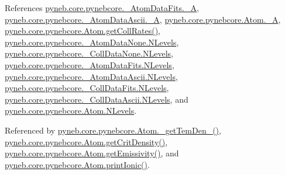 References \hyperlink{pynebcore_8py_source_l00100}{pyneb.\-core.\-pynebcore.\-\_\-\-Atom\-Data\-Fits.\-\_\-\-A}, \hyperlink{pynebcore_8py_source_l00415}{pyneb.\-core.\-pynebcore.\-\_\-\-Atom\-Data\-Ascii.\-\_\-\-A}, \hyperlink{pynebcore_8py_source_l01319}{pyneb.\-core.\-pynebcore.\-Atom.\-\_\-\-A}, \hyperlink{pynebcore_8py_source_l01394}{pyneb.\-core.\-pynebcore.\-Atom.\-get\-Coll\-Rates()}, \hyperlink{pynebcore_8py_source_l00069}{pyneb.\-core.\-pynebcore.\-\_\-\-Atom\-Data\-None.\-N\-Levels}, \hyperlink{pynebcore_8py_source_l00082}{pyneb.\-core.\-pynebcore.\-\_\-\-Coll\-Data\-None.\-N\-Levels}, \hyperlink{pynebcore_8py_source_l00098}{pyneb.\-core.\-pynebcore.\-\_\-\-Atom\-Data\-Fits.\-N\-Levels}, \hyperlink{pynebcore_8py_source_l00319}{pyneb.\-core.\-pynebcore.\-\_\-\-Atom\-Data\-Ascii.\-N\-Levels}, \hyperlink{pynebcore_8py_source_l00586}{pyneb.\-core.\-pynebcore.\-\_\-\-Coll\-Data\-Fits.\-N\-Levels}, \hyperlink{pynebcore_8py_source_l00933}{pyneb.\-core.\-pynebcore.\-\_\-\-Coll\-Data\-Ascii.\-N\-Levels}, and \hyperlink{pynebcore_8py_source_l01231}{pyneb.\-core.\-pynebcore.\-Atom.\-N\-Levels}.



Referenced by \hyperlink{pynebcore_8py_source_l01869}{pyneb.\-core.\-pynebcore.\-Atom.\-\_\-get\-Tem\-Den\-\_()}, \hyperlink{pynebcore_8py_source_l01759}{pyneb.\-core.\-pynebcore.\-Atom.\-get\-Crit\-Density()}, \hyperlink{pynebcore_8py_source_l01782}{pyneb.\-core.\-pynebcore.\-Atom.\-get\-Emissivity()}, and \hyperlink{pynebcore_8py_source_l02233}{pyneb.\-core.\-pynebcore.\-Atom.\-print\-Ionic()}.


